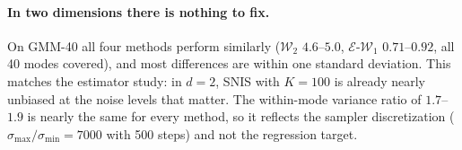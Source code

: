 
\paragraph{In two dimensions there is nothing to fix.}
On GMM-40 all four methods perform similarly ($\mathcal{W}_2$ $4.6$--$5.0$, $\mathcal{E}$-$\mathcal{W}_1$ $0.71$--$0.92$, all 40 modes covered), and most differences are within one standard deviation. This matches the estimator study: in $d=2$, SNIS with $K=100$ is already nearly unbiased at the noise levels that matter. The within-mode variance ratio of $1.7$--$1.9$ is nearly the same for every method, so it reflects the sampler discretization ($\sigma_{\max}/\sigma_{\min}=7000$ with 500 steps) and not the regression target.

